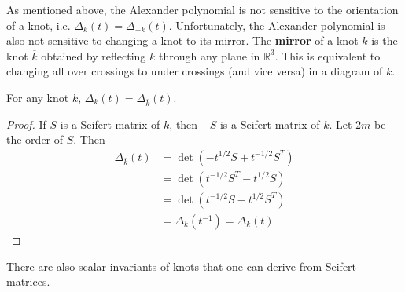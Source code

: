 As mentioned above, the Alexander polynomial is not sensitive to the orientation of a knot, i.e. $\Delta_k(t) = \Delta_{-k}(t)$. Unfortunately, the Alexander polynomial is also not sensitive to changing a knot to its mirror. The \textbf{mirror} of a knot $k$ is the knot $\overline{k}$ obtained by reflecting $k$ through any plane in $\mathbb R^3$. This is equivalent to changing all over crossings to under crossings (and vice versa) in a diagram of $k$.
\begin{prop}
For any knot $k$, $\Delta_{k}(t) = \Delta_{\overline{k}}(t)$.
\end{prop}
\begin{proof}
If $S$ is a Seifert matrix of $k$, then $-S$ is a Seifert matrix of $\overline k$. Let $2m$ be the order of $S$. Then
\begin{align*}
\Delta_{\overline k}(t) &= \det\left( -t^{1/2} S + t^{-1/2} S^T \right) \\
                        &= \det\left( t^{-1/2} S^T - t^{1/2} S \right) \\
                        &= \det\left( t^{-1/2} S - t^{1/2} S^T \right) \\
                        &= \Delta_k(t^{-1}) = \Delta_k(t) 
\end{align*}
\end{proof}

There are also scalar invariants of knots that one can derive from Seifert matrices.

